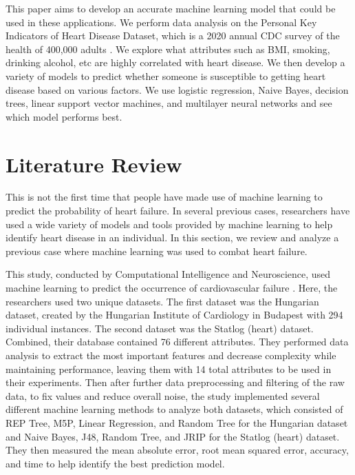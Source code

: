 \documentclass[a4paper]{article}
\begin{document}
This paper aims to develop an accurate machine learning model that could be used in these applications. We perform data analysis on the Personal Key Indicators of Heart Disease Dataset, which is a 2020 annual CDC survey of the health of 400,000 adults \cite{dataset}. We explore what attributes such as BMI, smoking, drinking alcohol, etc are highly correlated with heart disease. We then develop a variety of models to predict whether someone is susceptible to getting heart disease based on various factors. We use logistic regression, Naive Bayes, decision trees, linear support vector machines, and multilayer neural networks and see which model performs best. 


\section{Literature Review}

This is not the first time that people have made use of machine learning to predict the probability of heart failure. In several previous cases, researchers have used a wide variety of models and tools provided by machine learning to help identify heart disease in an individual. In this section, we review and analyze a previous case where machine learning was used to combat heart failure.

This study, conducted by Computational Intelligence and Neuroscience, used machine learning to predict the occurrence of cardiovascular failure \cite{review}. Here, the researchers used two unique datasets. The first dataset was the Hungarian dataset, created by the Hungarian Institute of Cardiology in Budapest with 294 individual instances. The second dataset was the Statlog (heart) dataset. Combined, their database contained 76 different attributes. They performed data analysis to extract the most important features and decrease complexity while maintaining performance, leaving them with 14 total attributes to be used in their experiments. Then after further data preprocessing and filtering of the raw data, to fix values and reduce overall noise, the study implemented several different machine learning methods to analyze both datasets, which consisted of REP Tree, M5P, Linear Regression, and Random Tree for the Hungarian dataset and Naive Bayes, J48, Random Tree, and JRIP for the Statlog (heart) dataset. They then measured the mean absolute error, root mean squared error, accuracy, and time to help identify the best prediction model. 
\end{document}
